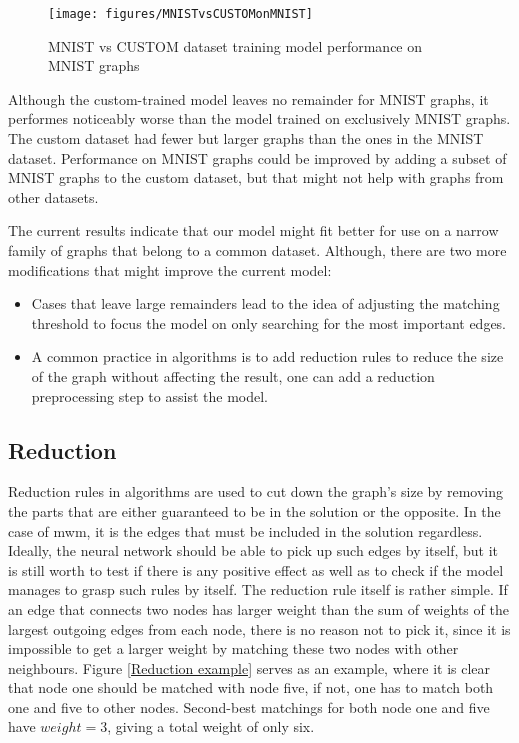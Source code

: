 \begin{figure}[H]
    \centering
    \hspace*{-2cm}
    \texttt{[image: figures/MNISTvsCUSTOMonMNIST]}
    \caption{MNIST vs CUSTOM dataset training model performance on MNIST graphs}
    \label{models performance comparison mnist}
\end{figure}

Although the custom-trained model leaves no remainder for MNIST graphs, it performes noticeably worse than the model trained on exclusively MNIST graphs. The custom dataset had fewer but larger graphs than the ones in the MNIST dataset. Performance on MNIST graphs could be improved by adding a subset of MNIST graphs to the custom dataset, but that might not help with graphs from other datasets.

The current results indicate that our model might fit better for use on a narrow family of graphs that belong to a common dataset. Although, there are two more modifications that might improve the current model:

\begin{itemize}
\item Cases that leave large remainders lead to the idea of adjusting the matching threshold to focus the model on only searching for the most important edges. 
\item A common practice in algorithms is to add reduction rules to reduce the size of the graph without affecting the result, one can add a reduction preprocessing step to assist the model.
\end{itemize}

\subsection{Reduction}

Reduction rules in algorithms are used to cut down the graph's size by removing the parts that are either guaranteed to be in the solution or the opposite. In the case of \gls{mwm}, it is the edges that must be included in the solution regardless. Ideally, the neural network should be able to pick up such edges by itself, but it is still worth to test if there is any positive effect as well as to check if the model manages to grasp such rules by itself. The reduction rule itself is rather simple. If an edge that connects two nodes has larger weight than the sum of weights of the largest outgoing edges from each node, there is no reason not to pick it, since it is impossible to get a larger weight by matching these two nodes with other neighbours. Figure \ref{Reduction example} serves as an example, where it is clear that node one should be matched with node five, if not, one has to match both one and five to other nodes. Second-best matchings for both node one and five have $weight = 3$, giving a total weight of only six.

